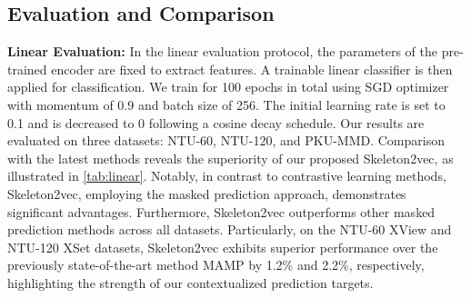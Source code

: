 \subsection{Evaluation and Comparison}
\noindent \textbf{Linear Evaluation:}
In the linear evaluation protocol, the parameters of the pre-trained encoder are
fixed to extract features. A trainable linear classifier is then applied for
classification. We train for 100 epochs in total using SGD optimizer with momentum of
0.9 and batch size of 256.
The initial learning rate is set to 0.1 and is decreased to 0 following a
cosine decay schedule.
Our results are evaluated on three datasets: NTU-60, NTU-120, and PKU-MMD.
Comparison with the latest methods reveals the superiority of our proposed Skeleton2vec,
as illustrated in \cref{tab:linear}. Notably, in contrast to contrastive learning
methods, Skeleton2vec, employing the masked prediction approach, demonstrates significant advantages.
Furthermore, Skeleton2vec outperforms other masked prediction methods across all datasets.
Particularly, on the NTU-60 XView and NTU-120 XSet datasets, Skeleton2vec exhibits
superior performance over the previously state-of-the-art method MAMP by 1.2\% and 2.2\%,
respectively, highlighting the strength of our contextualized prediction targets.


